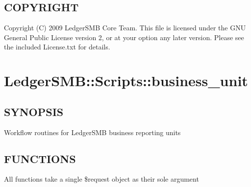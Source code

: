 \subsection*{COPYRIGHT\label{LedgerSMB:Scripts::account_LedgerSMB_workflow_scripts_for_managing_accounts_COPYRIGHT}}


Copyright (C) 2009 LedgerSMB Core Team.  This file is licensed under the GNU 
General Public License version 2, or at your option any later version.  Please
see the included License.txt for details.

\section{LedgerSMB::Scripts::business\_unit\label{LedgerSMB::Scripts::business_unit}}




\subsection*{SYNOPSIS\label{LedgerSMB::Scripts::business_unit_SYNOPSIS}}


Workflow routines for LedgerSMB business reporting units

\subsection*{FUNCTIONS\label{LedgerSMB::Scripts::business_unit_FUNCTIONS}}


All functions take a single \$request object as their sole argument

